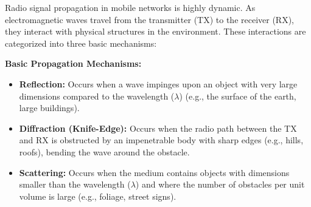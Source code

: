 \documentclass[12pt,a4paper]{article}
\begin{document}
Radio signal propagation in mobile networks is highly dynamic. As electromagnetic waves travel from the transmitter (TX) to the receiver (RX), they interact with physical structures in the environment. These interactions are categorized into three basic mechanisms:

\begin{tcolorbox}[defbox]
\textbf{Basic Propagation Mechanisms:}
\begin{itemize}[leftmargin=*, itemsep=3pt, topsep=0pt]
  \item \textbf{Reflection:} Occurs when a wave impinges upon an object with very large dimensions compared to the wavelength ($\lambda$) (e.g., the surface of the earth, large buildings).
  \item \textbf{Diffraction (Knife-Edge):} Occurs when the radio path between the TX and RX is obstructed by an impenetrable body with sharp edges (e.g., hills, roofs), bending the wave around the obstacle.
  \item \textbf{Scattering:} Occurs when the medium contains objects with dimensions smaller than the wavelength ($\lambda$) and where the number of obstacles per unit volume is large (e.g., foliage, street signs).
\end{itemize}
\end{tcolorbox}
\end{document}
